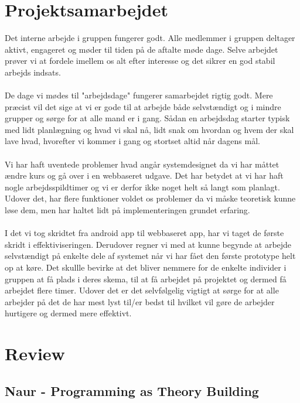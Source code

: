 \documentclass[12pt]{article}
\begin{document}
\section{Projektsamarbejdet}
Det interne arbejde i gruppen fungerer godt. Alle medlemmer i gruppen deltager aktivt, engageret og møder til tiden på de aftalte møde dage. Selve arbejdet prøver vi at fordele imellem os alt efter interesse og det sikrer en god stabil arbejds indsats.\\\\
 De dage vi mødes til "arbejdsdage" fungerer samarbejdet rigtig godt. Mere præcist vil det sige at vi er gode til at arbejde både selvstændigt og i mindre grupper og sørge for at alle mand er i gang. Sådan en arbejdsdag starter typisk med lidt planlægning og hvad vi skal nå, lidt snak om hvordan og hvem der skal lave hvad, hvorefter vi kommer i gang og stortset altid når dagens mål.\\\\
Vi har haft uventede problemer hvad angår systemdesignet da vi har måttet ændre kurs og gå over i en webbaseret udgave. Det har betydet at vi har haft nogle arbejdsspildtimer og vi er derfor ikke noget helt så langt som planlagt. Udover det, har flere funktioner voldet os problemer da vi måske teoretisk kunne løse dem, men har haltet lidt på implementeringen grundet erfaring. \\\\
I det vi tog skridtet fra android app til webbaseret app, har vi taget de første skridt i effektiviseringen. Derudover regner vi med at kunne begynde at arbejde selvstændigt på enkelte dele af systemet når vi har fået den første prototype helt op at køre. Det skullle bevirke at det bliver nemmere for de enkelte individer i gruppen at få plads i deres skema, til at få arbejdet på projektet og dermed få arbejdet flere timer. Udover det er det selvfølgelig vigtigt at sørge for at alle arbejder på det de har mest lyst til/er bedst til hvilket vil gøre de arbejder hurtigere og dermed mere effektivt.


\pagebreak
\section{Review}
\subsection*{Naur - Programming as Theory Building}
\end{document}
